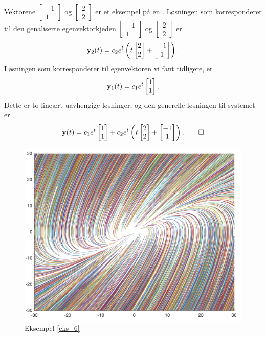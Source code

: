 \begin{ex}
\label{eks_6}
Vektorene 
$
\begin{bmatrix}
-1  \\
1 
\end{bmatrix}
$
og 
$
\begin{bmatrix}
2  \\
2 
\end{bmatrix}
$
er et eksempel på en . 
Løsningen som korresponderer til den genaliserte egenvektorkjeden 
$
\begin{bmatrix}
-1  \\
1 
\end{bmatrix}
$
og 
$
\begin{bmatrix}
2  \\
2 
\end{bmatrix}
$
er 
\[
\mathbf{y}_2(t) = c_2 e^t
\left(
t
\begin{bmatrix}
2  \\
2 
\end{bmatrix}
+
\begin{bmatrix}
-1  \\
1 
\end{bmatrix}
\right).
\]
Løsningen som korresponderer til egenvektoren 
vi fant tidligere, er 
\[
\mathbf{y}_1(t) = c_1 e^t
\begin{bmatrix}
1  \\
1 
\end{bmatrix}.
\]
Dette er to lineært uavhengige løsninger, og den generelle løsningen til systemet er 
\[
\mathbf{y}(t) = c_1 e^t
\begin{bmatrix}
1  \\
1 
\end{bmatrix}
+ c_2 e^t
\left(
t
\begin{bmatrix}
2  \\
2 
\end{bmatrix}
+
\begin{bmatrix}
-1  \\
1 
\end{bmatrix}
\right).\qedhere
\]
\end{ex}


\begin{figure}[htbp]
  \begin{center}
	\includegraphics[scale=.1]{eks_6.jpg}
	\captionsetup{labelformat=empty}
	\caption{Eksempel \ref{eks_6}}
	\end{center}
\end{figure}


\kapittelslutt

